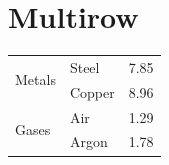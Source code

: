 \documentclass{article}
\begin{document}
\section{Multirow}
\begin{tabular}{llr}
\hline
\multirow{2}{*}{Metals} & Steel  & 7.85 \\
                        & Copper & 8.96 \\
\hline
\multirow{2}{*}{Gases}  & Air    & 1.29 \\
                        & Argon  & 1.78 \\
\hline
\end{tabular}
\end{document}
